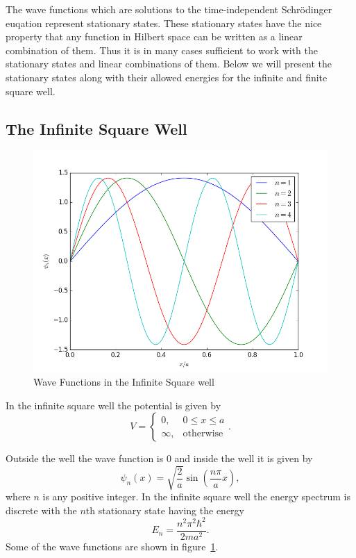 \documentclass[12pt,a4paper]{article}
\begin{document}
The wave functions which are solutions to the time-independent Schrödinger euqation represent stationary states. These stationary states have the nice property that any function in Hilbert space can be written as a linear combination of them. Thus it is in many cases sufficient to work with the stationary states and linear combinations of them. Below we will present the stationary states along with their allowed energies for the infinite and finite square well.

\subsection{The Infinite Square Well}
\begin{figure}
\includegraphics[width=\textwidth]{../Python/ISW_stationarySolutions.png}
\caption{Wave Functions in the Infinite Square well}
\label{fig:infiniteSquareWell}
\end{figure}

In the infinite square well the potential is given by
\begin{equation}
V = \begin{cases} 0, & 0 \leq x \leq a \\
                  \infty, & \text{otherwise} \end{cases}.
\end{equation}

Outside the well the wave function is $0$ and inside the well it is given by
\begin{equation}
\psi_n(x) = \sqrt{\frac{2}{a}} \sin \left( \frac{n \pi}{a} x \right),
\end{equation}
where $n$ is any positive integer. In the infinite square well the energy spectrum is discrete with the $n$th stationary state having the energy
\begin{equation}
E_n = \frac{n^2 \pi^2 \hbar^2}{2 m a^2}.
\end{equation}
Some of the wave functions are shown in figure~\ref{fig:infiniteSquareWell}.
\end{document}
